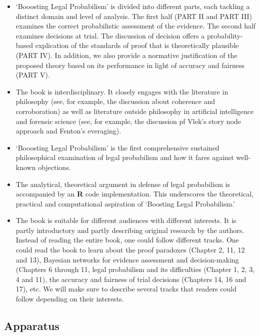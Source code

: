 \documentclass[
  10pt,
  dvipsnames,enabledeprecatedfontcommands]{scrartcl}
\newcommand{\raf}[1]{\todo[color=olive!40]{#1}}
\begin{document}
\begin{itemize}
\item
  `Booosting Legal Probabilism' is divided into different parts, each
  tackling a distinct domain and level of analysis. The first half (PART
  II and PART III) examines the correct probabilistic assessment of the
  evidence. The second half examines decisions at trial. The discussion
  of decision offers a probability-based explication of the standards of
  proof that is theoretically plausible (PART IV). In addition, we also
  provide a normative justification of the proposed theory based on its
  performance in light of accuracy and fairness (PART V).
\item
  The book is interdisciplinary. It closely engages with the literature
  in philosophy (see, for example, the discussion about coherence and
  corroboration) as well as literature outside philosophy in artificial
  intelligence and forensic science (see, for example, the discussion pf
  Vlek's story node approach and Fenton's everaging).
\item
  `Booosting Legal Probabilism' is the first comprehensive sustained
  philosophical examination of legal probabilism and how it fares
  against well-known objections.
\item
  The analytical, theoretical argument in defense of legal probabilism
  is accompanied by an \textbf{\textsf{R}} code implementation. This
  underscores the theoretical, practical and computational aspiration of
  `Boosting Legal Probabilism.'
\item
  The book is suitable for different audiences with different interests.
  It is partly introductory and partly describing original research by
  the authors. Instead of reading the entire book, one could follow
  different tracks. One could read the book to learn about the proof
  paradoxes (Chapter 2, 11, 12 and 13), Bayesian networks for evidence
  assessment and decision-making (Chapters 6 through 11, legal
  probabilism and its difficulties (Chapter 1, 2, 3, 4 and 11), the
  accuracy and fairness of trial decisions (Chapters 14, 16 and 17),
  etc. We will make sure to describe several tracks that readers could
  follow depending on their interests.
\end{itemize}

\raf{M: What else?}

\hypertarget{apparatus}{%
\subsection{Apparatus}\label{apparatus}}
\end{document}
